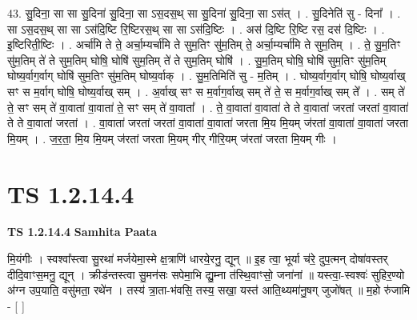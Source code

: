 \documentclass[17pt]{extarticle}
\begin{document}
43. सु॒दिना॒ सा सा सु॒दिना॑ सु॒दिना॒ सा ऽस॒दस॒थ् सा सु॒दिना॑ सु॒दिना॒ सा ऽस॑त् । . सु॒दिनेति॑ सु - दिना᳚ । . सा ऽस॒दस॒थ् सा सा ऽस॑दि॒ष्टि रि॒ष्टिरस॒थ् सा सा ऽस॑दि॒ष्टिः । . अस॑ दि॒ष्टि रि॒ष्टि रस॒ दस॑ दि॒ष्टिः । . इ॒ष्टिरिती॒ष्टिः । . अर्चा॑मि ते ते॒ अर्चा॒म्यर्चा॑मि ते सुम॒तिꣳ सु॑म॒तिम् ते॒ अर्चा॒म्यर्चा॑मि ते सुम॒तिम् । . ते॒ सु॒म॒तिꣳ सु॑म॒तिम् ते॑ ते सुम॒तिम् घोषि॒ घोषि॑ सुम॒तिम् ते॑ ते सुम॒तिम् घोषि॑ । . सु॒म॒तिम् घोषि॒ घोषि॑ सुम॒तिꣳ सु॑म॒तिम् घोष्य॒र्वाग॒र्वाग् घोषि॑ सुम॒तिꣳ सु॑म॒तिम् घोष्य॒र्वाक् । . सु॒म॒तिमिति॑ सु - म॒तिम् । . घोष्य॒र्वाग॒र्वाग् घोषि॒ घोष्य॒र्वाख् सꣳ स म॒र्वाग् घोषि॒ घोष्य॒र्वाख् सम् । . अ॒र्वाख् सꣳ स म॒र्वाग॒र्वाख् सम् ते॑ ते॒ स म॒र्वाग॒र्वाख् सम् ते᳚ । . सम् ते॑ ते॒ सꣳ सम् ते॑ वा॒वाता॑ वा॒वाता॑ ते॒ सꣳ सम् ते॑ वा॒वाता᳚ । . ते॒ वा॒वाता॑ वा॒वाता॑ ते ते वा॒वाता॑ जरतां जरतां वा॒वाता॑ ते ते वा॒वाता॑ जरतां । . वा॒वाता॑ जरतां जरतां वा॒वाता॑ वा॒वाता॑ जरता मि॒य मि॒यम् ज॑रतां वा॒वाता॑ वा॒वाता॑ जरता मि॒यम् । . ज॒र॒ता॒ मि॒य मि॒यम् ज॑रतां जरता मि॒यम् गीर् गीरि॒यम् ज॑रतां जरता मि॒यम् गीः । \newline
\pagebreak
{}
\section*{ TS 1.2.14.4 }

\textbf{TS 1.2.14.4 } \newline
\textbf{Samhita Paata} \newline

मि॒यंगीः । स्वश्वा᳚स्त्वा सु॒रथा॑ मर्जयेमा॒स्मे क्ष॒त्राणि॑ धारये॒रनु॒ द्यून् ॥ इ॒ह त्वा॒ भूर्या च॑रे॒ दुप॒त्मन् दोषा॑वस्तर् दीदि॒वाꣳस॒मनु॒ द्यून् । क्रीड॑न्तस्त्वा सु॒मन॑सः सपेमा॒भि द्यु॒म्ना त॑स्थि॒वाꣳसो॒ जना॑नां ॥ यस्त्वा॒-स्वश्वः॑ सुहिर॒ण्यो अ॑ग्न उप॒याति॒ वसु॑मता॒ रथे॑न । तस्य॑ त्रा॒ता-भ॑वसि॒ तस्य॒ सखा॒ यस्त॑ आति॒थ्यमा॑नु॒षग् जुजो॑षत् ॥ म॒हो रु॑जामि - [ ] \newline
\end{document}

